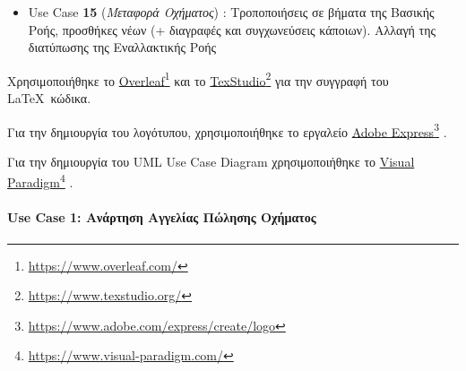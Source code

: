 \documentclass{../ol-softwaremanual}
\newcommand{\doclink}[2]{\href{#1}{#2}\footnote{\url{#1}}}
\begin{document}
\begin{itemize}
		\item \en Use Case \textbf{15} \gr (\textit{Μεταφορά Οχήματος}) : Τροποποιήσεις σε βήματα της Βασικής Ροής, 	προσθήκες νέων (+ διαγραφές και συγχωνεύσεις κάποιων). Αλλαγή της διατύπωσης της Εναλλακτικής Ροής 
		
	\end{itemize}
	


	\newpage	
	
	
	\vspace{20pt}
	\flushleft
	Χρησιμοποιήθηκε το \en \doclink{https://www.overleaf.com/}{Overleaf} \gr και το \en \doclink{https://www.texstudio.org/}{TexStudio} \gr για την συγγραφή του \LaTeX\ κώδικα. \break
	
	Για την δημιουργία του λογότυπου, χρησιμοποιήθηκε το εργαλείο \en \doclink{https://www.adobe.com/express/create/logo}{Adobe Express} . \gr \break
	
	Για την δημιουργία του \en UML Use Case Diagram \gr χρησιμοποιήθηκε το \en \doclink{https://www.visual-paradigm.com/}{Visual Paradigm} . \gr \break 
	
	\newpage
	
	
	\paragraph{\en Use Case 1: \gr Ανάρτηση Αγγελίας Πώλησης Οχήματος}
	
\end{document}
